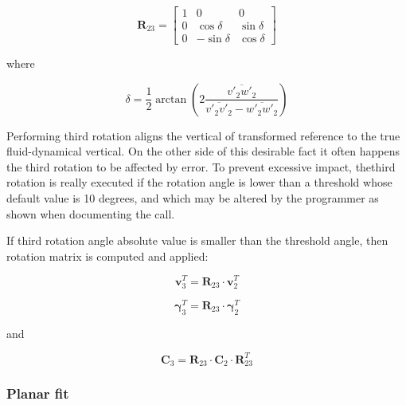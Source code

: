 \documentclass[a4paper,10pt]{book}
\begin{document}
\begin{equation}\label{eq:Third rotation in EC}
 \mathbf{R}_{23} = \left[
  \begin{array}{ccc}
    1 &       0      &      0      \\
    0 &  \cos \delta & \sin \delta \\
    0 & -\sin \delta & \cos \delta
  \end{array}
 \right]
\end{equation}

\noindent where

\begin{equation}\label{eq:Delta angle}
  \delta = \frac{1}{2} \arctan \left( 
    2 \frac
      {\overline{v'_{2} w'_{2}}}
      {\overline{v'_{2}v'_{2}} - \overline{w'_{2}w'_{2}}}
  \right)
\end{equation} 

Performing third rotation aligns the vertical of transformed reference to the true fluid-dynamical vertical. On the other side of this desirable fact it often happens the third rotation to be affected by error. To prevent excessive impact, thethird rotation is really executed if the rotation angle is lower than a threshold whose default value is 10 degrees, and which may be altered by the programmer as shown when documenting the call.

If third rotation angle absolute value is smaller than the threshold angle, then rotation matrix is computed and applied:

\begin{equation}\label{eq:Transformation of wind speed in the third rotation}
  \mathbf{v}_{3}^{T} = \mathbf{R}_{23} \cdot \mathbf{v}_{2}^{T}
\end{equation} 

\begin{equation}\label{eq:Transformation of scalar covariances in the third rotation}
  \mathbf{\gamma}_{3}^{T} = \mathbf{R}_{23} \cdot \mathbf{\gamma}_{2}^{T}
\end{equation} 

\noindent and

\begin{equation}\label{eq:Transformation of wind covariances in the third rotation}
  \mathbf{C}_{3} = \mathbf{R}_{23} \cdot \mathbf{C}_{2} \cdot \mathbf{R}_{23}^{T}
\end{equation} 

\subsubsection{Planar fit}
\end{document}

